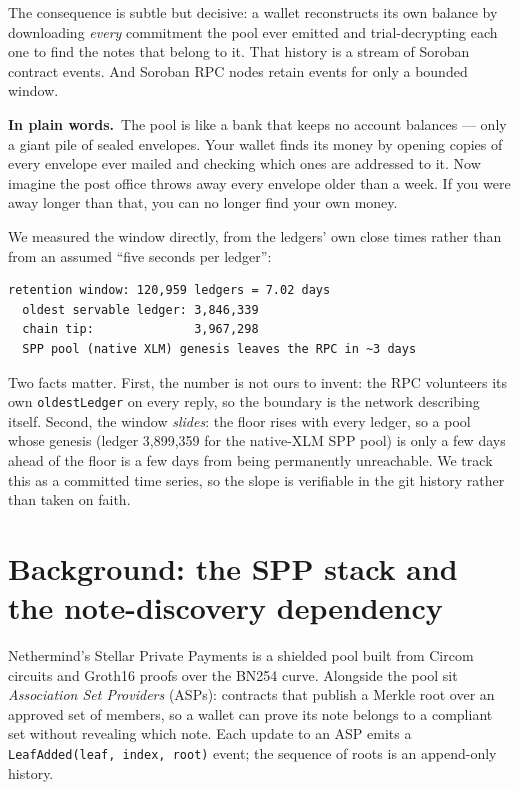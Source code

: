 \documentclass[11pt]{article}
\newcommand{\intuition}[1]{%
  \par\vspace{0.5em}%
  \noindent\colorbox{soft}{\parbox{\dimexpr\linewidth-2\fboxsep}{%
  \small\textbf{\color{klein}In plain words.}\ #1}}%
  \par\vspace{0.5em}%
}
\newcommand{\code}[1]{\texttt{\small #1}}
\begin{document}
The consequence is subtle but decisive: a wallet reconstructs its own balance by
downloading \emph{every} commitment the pool ever emitted and trial-decrypting
each one to find the notes that belong to it. That history is a stream of Soroban
contract events. And Soroban RPC nodes retain events for only a bounded window.

\intuition{The pool is like a bank that keeps no account balances --- only a giant
pile of sealed envelopes. Your wallet finds its money by opening copies of every
envelope ever mailed and checking which ones are addressed to it. Now imagine the
post office throws away every envelope older than a week. If you were away longer
than that, you can no longer find your own money.}

We measured the window directly, from the ledgers' own close times rather than
from an assumed ``five seconds per ledger'':

\begin{lstlisting}
retention window: 120,959 ledgers = 7.02 days
  oldest servable ledger: 3,846,339
  chain tip:              3,967,298
  SPP pool (native XLM) genesis leaves the RPC in ~3 days
\end{lstlisting}

Two facts matter. First, the number is not ours to invent: the RPC volunteers its
own \code{oldestLedger} on every reply, so the boundary is the network describing
itself. Second, the window \emph{slides}: the floor rises with every ledger, so a
pool whose genesis (ledger 3{,}899{,}359 for the native-XLM SPP pool) is only a
few days ahead of the floor is a few days from being permanently unreachable. We
track this as a committed time series, so the slope is verifiable in the git
history rather than taken on faith.

\section{Background: the SPP stack and the note-discovery dependency}

Nethermind's Stellar Private Payments is a shielded pool built from Circom
circuits and Groth16 proofs over the BN254 curve. Alongside the pool sit
\emph{Association Set Providers} (ASPs): contracts that publish a Merkle root over
an approved set of members, so a wallet can prove its note belongs to a
compliant set without revealing which note. Each update to an ASP emits a
\code{LeafAdded(leaf, index, root)} event; the sequence of roots is an
append-only history.
\end{document}

